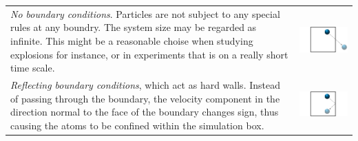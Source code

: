 \documentclass[twoside,english]{uiofysmaster}
\begin{document}
\hspace{-9.37mm}
\begin{tabular}{p{} p{}}
	\vspace{0pt}  {\it No boundary conditions}. Particles are not subject to any special rules at any boundry. The system size may be regarded as infinite. This  might be a reasonable choise when studying explosions for instance, or in experiments that is on a really short time scale.  
	& \vspace{0pt} \hspace*{-1.3cm} \includegraphics[width=1.3\linewidth]{figures/BoundaryConditions/no.pdf} 
	\\*
	\vspace{0pt} {\it Reflecting boundary conditions}, which act as hard walls. Instead of passing through the boundary, the velocity component in the direction normal to the face of the boundary changes sign, thus causing the atoms to be confined within the simulation box. 
	& \vspace{0pt} \hspace*{-1.3cm} \includegraphics[width=1.3\linewidth]{figures/BoundaryConditions/reflecting.pdf} 
	\\*

\end{tabular}
\end{document}
